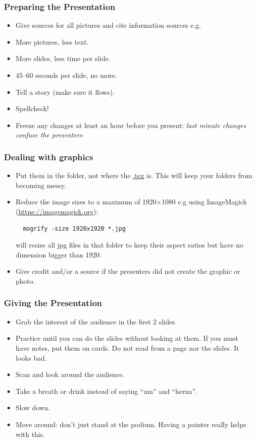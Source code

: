 \documentclass[aspectratio=169]{rubeamer}
\begin{document}
\begin{frame}
  \frametitle{Preparing the Presentation}
  \begin{itemize}
  \item Give sources for all pictures and cite information sources e.g. \cite{vossebeld2018customer}
  \item More pictures, less text.
  \item More slides, less time per slide.
  \item 45--60 seconds per slide, no more.
  \item Tell a story (make sure it flows).
  \item Spellcheck!
  \item Freeze any changes at least an hour before you present:  {\em last minute changes confuse the presenters}\/
  \end{itemize}
\end{frame}

\begin{frame}[fragile]%
  \frametitle{Dealing with graphics}
  \begin{itemize}
  \item Put them in the  folder, not where the \url{.tex} is.  This will keep your folders from becoming messy.
  \item Reduce the image sizes to a maximum of 1920$\times$1080 e.g using ImageMagick (\url{https://imagemagick.org}):
\begin{verbatim}
  mogrify -size 1920x1920 *.jpg
\end{verbatim}
    will resize all jpg files in that folder to keep their aspect ratios but have no dimension bigger than 1920.
    \item Give credit and/or a source if the presenters did not create the graphic or photo.
  \end{itemize}
  
\end{frame}

\begin{frame}
  \frametitle{Giving the Presentation}
  \begin{itemize}
  \item Grab the interest of the audience in the first 2 slides
  \item Practice until you can do the slides without looking at them.
    If you must have notes, put them on cards.  Do not read from a page
    nor the slides.  It looks bad.
  \item Scan and look around the audience.
  \item Take a breath or drink instead of saying ``um'' and ``herna''.
  \item Slow down.
  \item Move around: don't just stand at the podium.  Having a pointer really helps with this.
  \end{itemize}
\end{frame}
\end{document}
